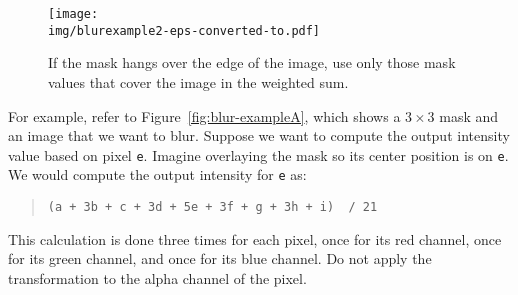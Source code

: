 \begin{figure}
  \begin{minipage}[c]{0.6\textwidth}\centering
    \texttt{[image: \\img/blurexample2-eps-converted-to.pdf]}
  \end{minipage}\hfill
  \begin{minipage}[c]{0.37\textwidth}
    \caption{If the mask hangs over the edge of the image, use only those mask
      values that cover the image in the weighted sum.}
    \label{fig:blur-exampleB}
  \end{minipage}
\end{figure}

For example, refer to Figure~\ref{fig:blur-exampleA}, which shows a $3 \times
3$ mask and an image that we want to blur. Suppose we want to compute the
output intensity value based on pixel \lstinline'e'.  Imagine overlaying the
mask so its center position is on \lstinline'e'.  We would compute the output
intensity for \lstinline'e' as:

\begin{quote}
\begin{lstlisting}
(a + 3b + c + 3d + 5e + 3f + g + 3h + i)  / 21
\end{lstlisting}
\end{quote}
This calculation is done three times for each pixel, once for its red channel,
once for its green channel, and once for its blue channel. Do not apply the
transformation to the alpha channel of the pixel.



